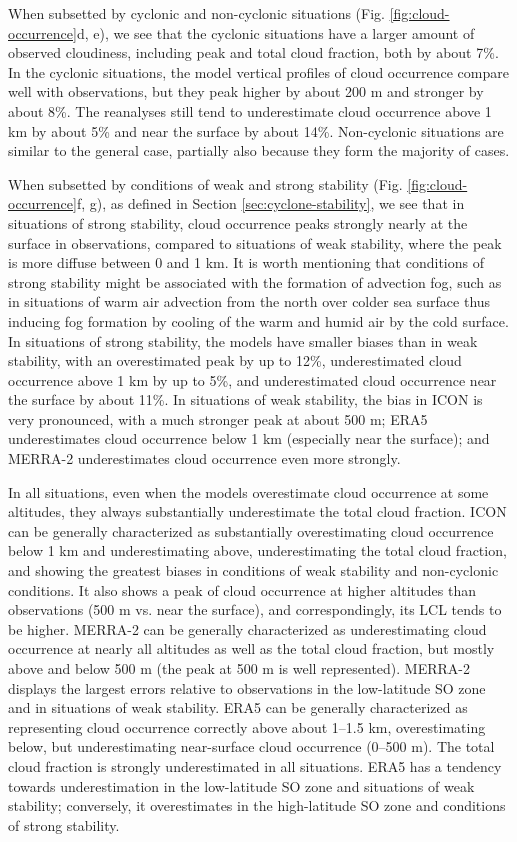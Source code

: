 \documentclass[draft]{agujournal2019}
\begin{document}
When subsetted by cyclonic and non-cyclonic situations (Fig. \ref{fig:cloud-occurrence}d, e), we see that the cyclonic situations have a larger amount of observed cloudiness, including peak and total cloud fraction, both by about 7\%. In the cyclonic situations, the model vertical profiles of cloud occurrence compare well with observations, but they peak higher by about 200 m and stronger by about 8\%. The reanalyses still tend to underestimate cloud occurrence above 1 km by about 5\% and near the surface by about 14\%. Non-cyclonic situations are similar to the general case, partially also because they form the majority of cases.

When subsetted by conditions of weak and strong stability (Fig. \ref{fig:cloud-occurrence}f, g), as defined in Section \ref{sec:cyclone-stability}, we see that in situations of strong stability, cloud occurrence peaks strongly nearly at the surface in observations, compared to situations of weak stability, where the peak is more diffuse between 0 and 1 km. It is worth mentioning that conditions of strong stability might be associated with the formation of advection fog, such as in situations of warm air advection from the north over colder sea surface thus inducing fog formation by cooling of the warm and humid air by the cold surface. In situations of strong stability, the models have smaller biases than in weak stability, with an overestimated peak by up to 12\%, underestimated cloud occurrence above 1 km by up to 5\%, and underestimated cloud occurrence near the surface by about 11\%. In situations of weak stability, the bias in ICON is very pronounced, with a much stronger peak at about 500 m; ERA5 underestimates cloud occurrence below 1 km (especially near the surface); and MERRA-2 underestimates cloud occurrence even more strongly.

In all situations, even when the models overestimate cloud occurrence at some altitudes, they always substantially underestimate the total cloud fraction. ICON can be generally characterized as substantially overestimating cloud occurrence below 1 km and underestimating above, underestimating the total cloud fraction, and showing the greatest biases in conditions of weak stability and non-cyclonic conditions. It also shows a peak of cloud occurrence at higher altitudes than observations (500 m vs. near the surface), and correspondingly, its LCL tends to be higher. MERRA-2 can be generally characterized as underestimating cloud occurrence at nearly all altitudes as well as the total cloud fraction, but mostly above and below 500 m (the peak at 500 m is well represented). MERRA-2 displays the largest errors relative to observations in the low-latitude SO zone and in situations of weak stability. ERA5 can be generally characterized as representing cloud occurrence correctly above about 1--1.5 km, overestimating below, but underestimating near-surface cloud occurrence (0--500 m). The total cloud fraction is strongly underestimated in all situations. ERA5 has a tendency towards underestimation in the low-latitude SO zone and situations of weak stability; conversely, it overestimates in the high-latitude SO zone and conditions of strong stability.
\end{document}
